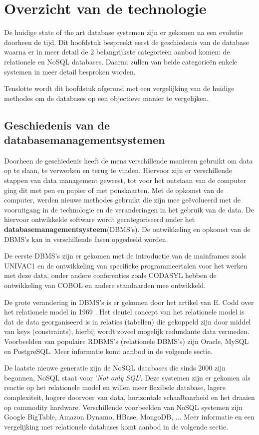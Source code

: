 \chapter{Overzicht van de technologie}
De huidige state of the art database systemen zijn er gekomen na een evolutie doorheen de tijd. Dit hoofdstuk bespreekt eerst de geschiedenis van de database waarna er in meer detail de 2 belangrijkste categorieën aanbod komen: de relationele en NoSQL databases. Daarna zullen van beide categorieën enkele systemen in meer detail besproken worden. 

Tenslotte wordt dit hoofdstuk afgerond met een vergelijking van de huidige methodes om de databases op een objectieve manier te vergelijken. 

\section{Geschiedenis van de databasemanagementsystemen}
Doorheen de geschiedenis heeft de mens verschillende manieren gebruikt om data op te slaan, te verwerken en terug te vinden. Hiervoor zijn er verschillende stappen van data management geweest, tot voor het ontstaan van de computer ging dit met pen en papier of met ponskaarten\cite{gray2007data}. Met de opkomst van de computer, werden nieuwe methodes gebruikt die zijn mee geëvolueerd met de vooruitgang in de technologie en de veranderingen in het gebruik van de data. De hiervoor ontwikkelde software wordt gecategoriseerd onder het \textbf{databasemanagementsysteem}(DBMS's). De ontwikkeling en opkomst van de DBMS's kan in verschillende fasen opgedeeld worden.  

De eerste DBMS's zijn er gekomen met de introductie van de mainframes zoals UNIVAC1 en de ontwikkeling van specifieke programmeertalen voor het werken met deze data, onder andere conferenties zoals CODASYL hebben de ontwikkeling van COBOL en andere standaarden mee ontwikkeld\cite{gray2007data}. 

De grote verandering in DBMS's is er gekomen door het artikel van E. Codd over het relationele model in 1969 \cite{codd1970relational}. Het sleutel concept van het relationele model is dat de data georganiseerd is in relaties (tabellen) die gekoppeld zijn door middel van keys (constraints), hierbij wordt zoveel mogelijk redundante data vermeden. 
Voorbeelden van populaire RDBMS's (relationele DBMS's) zijn Oracle, MySQL en PostgreSQL. Meer informatie komt aanbod in de volgende sectie. 

De laatste nieuwe generatie zijn de NoSQL databases die sinds 2000 zijn begonnen, NoSQL staat voor '\textit{Not only SQL}'. Deze systemen zijn er gekomen als reactie op het relationele model en willen meer flexibele database, lagere complexiteit, hogere doorvoer van data, horizontale schaalbaarheid en het draaien op commodity hardware.  Verschillende voorbeelden van NoSQL systemen zijn Google BigTable, Amazon Dynamo, HBase, MongoDB, ... \cite{Strauch.NoSQL} Meer informatie en een vergelijking met relationele databases komt aanbod in de volgende sectie. 

